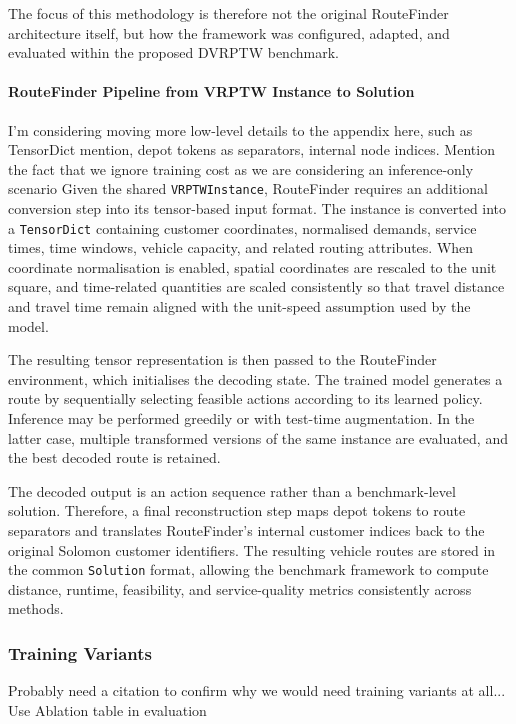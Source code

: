 The focus of this methodology is therefore not the original RouteFinder
architecture itself, but how the framework was configured, adapted, and
evaluated within the proposed DVRPTW benchmark.

\paragraph{RouteFinder Pipeline from VRPTW Instance to Solution}
{\color{red} I'm considering moving more low-level details to the appendix here,
such as TensorDict mention, depot tokens as separators, internal node indices.
Mention the fact that we ignore training cost as we are considering an
inference-only scenario} Given the shared
\texttt{VRPTWInstance},
RouteFinder requires an additional conversion step into its tensor-based input
format. The instance is converted into a
\texttt{TensorDict}
containing customer coordinates, normalised demands, service times, time
windows, vehicle capacity, and related routing attributes. When coordinate
normalisation is enabled, spatial coordinates are rescaled to the unit square,
and time-related quantities are scaled consistently so that travel distance and
travel time remain aligned with the unit-speed assumption used by the model.

The resulting tensor representation is then passed to the RouteFinder
environment, which initialises the decoding state. The trained model generates a
route by sequentially selecting feasible actions according to its learned
policy. Inference may be performed greedily or with test-time augmentation. In
the latter case, multiple transformed versions of the same instance are
evaluated, and the best decoded route is retained.

The decoded output is an action sequence rather than a benchmark-level solution.
Therefore, a final reconstruction step maps depot tokens to route separators and
translates RouteFinder's internal customer indices back to the original Solomon
customer identifiers. The resulting vehicle routes are stored in the common
\texttt{Solution} format, allowing the benchmark framework to compute distance,
runtime, feasibility, and service-quality metrics consistently across methods.

\subsubsection{Training Variants}

{\color{red} Probably need a citation to confirm why we would need training
variants at all...} {\color{red} Use Ablation table in evaluation}

